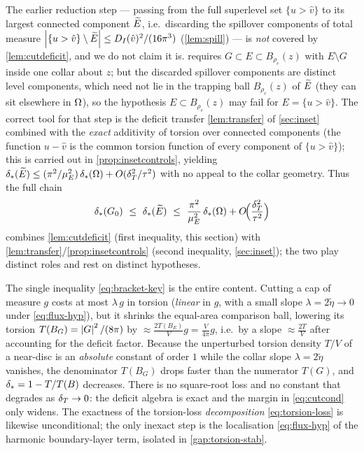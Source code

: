 \begin{remark}\label{rem:transfer-not-cut}
The earlier reduction step --- passing from the full superlevel set
$\{u>\hat v\}$ to its largest connected component $\widetilde{E}$, i.e.\ discarding
the spillover components of total measure
$\left\lvert\{u>\hat v\}\setminus\widetilde{E}\right\rvert\le D_I(\hat v)^2/(16\pi^3)$
(\cref{lem:spill}) --- is \emph{not} covered by \cref{lem:cutdeficit}, and we
do not claim it is.  requires
$G\subset E\subset B_{\rho_e}(z)$ with $E\setminus G$ inside one collar about
$z$; but the discarded spillover components are distinct level components,
which need not lie in the trapping ball $B_{\rho_e}(z)$ of $\widetilde{E}$ (they can
sit elsewhere in $\Omega$), so the hypothesis $E\subset B_{\rho_e}(z)$ may fail
for $E=\{u>\hat v\}$. The correct tool for that step is the deficit transfer
\cref{lem:transfer} of \cref{sec:inset} combined with the \emph{exact}
additivity of torsion over connected components (the function $u-\hat v$ is
the common torsion function of every component of $\{u>\hat v\}$); this is
carried out in \cref{prop:insetcontrols}, yielding $\delta_{*}(\widetilde{E})\le
(\pi^2/\mu_E^2)\,\delta_{*}(\Omega)+O(\delta_T^2/\tau^2)$ with no appeal to the collar
geometry. Thus the full chain
\[
   \dstar(G_0)\ \le\ \dstar(\Etil)
   \ \le\ \frac{\pi^2}{\mu_E^2}\,\dstar(\Om)+O\!\Bigl(\frac{\dT^2}{\tau^2}\Bigr)
\]
combines \cref{lem:cutdeficit} (first inequality, this section) with
\cref{lem:transfer}/\cref{prop:insetcontrols} (second inequality,
\cref{sec:inset}); the two play distinct roles and rest on distinct
hypotheses.
\end{remark}

\begin{remark}\label{rem:mechanism}
The single inequality \eqref{eq:bracket-key} is the entire content. Cutting
a cap of measure $g$ costs at most $\lambda\,g$ in torsion (\emph{linear} in
$g$, with a small slope $\lambda=2\tilde\eta\to0$ under \eqref{eq:flux-hyp}),
but it shrinks the equal-area comparison ball, lowering its torsion
$T(B_G)=\left\lvert G\right\rvert^2/(8\pi)$ by $\approx\frac{2T(B_E)}{V}g=\frac{V}{4\pi}g$, i.e.\
by a slope $\approx\frac{2T}{V}$ after accounting for the deficit factor.
Because the unperturbed torsion density $T/V$ of a near-disc is an
\emph{absolute} constant of order $1$ while the collar slope
$\lambda=2\tilde\eta$ vanishes, the denominator $T(B_G)$ drops faster than the
numerator $T(G)$, and $\delta_{*}=1-T/T(B)$ decreases. There is no square-root
loss and no constant that degrades as $\delta_T\to0$: the deficit algebra is exact
and the margin in \eqref{eq:cutcond} only widens. The exactness of the
torsion-loss \emph{decomposition} \eqref{eq:torsion-loss} is likewise
unconditional; the only inexact step is the localisation \eqref{eq:flux-hyp}
of the harmonic boundary-layer term, isolated in \cref{gap:torsion-stab}.
\end{remark}
